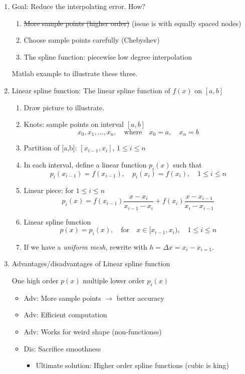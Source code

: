 \documentclass{article}
\theoremstyle{remark}
\begin{document}
\begin{enumerate}
\item Goal: Reduce the interpolating error. How?
\begin{enumerate}
\item \st{More sample points (higher order)} (issue is with equally spaced nodes)
\item Choose sample points carefully (Chebyshev)
\item The spline function: piecewise low degree interpolation
\end{enumerate}
Matlab example to illustrate these three.

\item Linear spline function: The linear spline function of $f(x)$ on $[a,b]$
\begin{enumerate}
\item Draw picture to illustrate.
\item Knots: sample points on interval $[a,b]$
$$
x_0, x_1,\dots,x_n,\quad\text{where}\quad  x_0 = a,\quad x_n = b
$$
\item Partition of [a,b]: $[x_{i-1}, x_i]$, \quad $1\leq i \leq n$
\item In each interval, define a linear function $p_i(x)$ such that
$$
p_i(x_{i-1}) = f(x_{i-1}),\quad p_i(x_{i}) = f(x_{i}),\quad 1\leq i\leq n
$$
\item Linear piece: for $1\leq i\leq n$
$$
p_i(x) = f(x_{i-1})\frac{x-x_{i}}{x_{i-1}-x_{i}} +  f(x_{i})\frac{x-x_{i-1}}{x_{i}-x_{i-1}}
$$
\item Linear spline function
$$
p(x) = p_i(x),\quad \text{for}\quad x\in [x_{i-1},x_{i}), \quad 1\leq i \leq n
$$
\item If we have a \emph{uniform mesh}, rewrite with $h = \Delta x = x_i - x_{i=1}$.
\end{enumerate}

\item Advantages/disadvantages of Linear spline function
\begin{center}
One high order $p(x)$  \quad multiple lower order $p_i(x)$
\end{center}
\begin{itemize}
\item Adv: More sample points $\rightarrow$ better accuracy
\item Adv: Efficient computation
\item Adv: Works for weird shape (non-functionss)
\item Dis: Sacrifice smoothness
\begin{itemize}
\item Ultimate solution: Higher order spline functions (cubic is king)
\end{itemize}
\end{itemize}


\end{enumerate}
\end{document}
